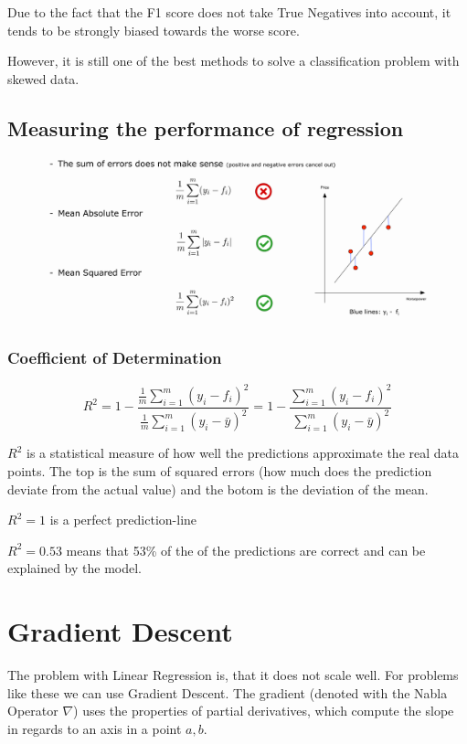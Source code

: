 \documentclass[11pt]{article}
\begin{document}
Due to the fact that the F1 score does not take True Negatives into account, it tends to be strongly biased towards the worse score.

However, it is still one of the best methods to solve a classification problem with skewed data.


\subsection{Measuring the performance of regression}

\begin{figure}[htb]
    \centering
    \includegraphics[keepaspectratio=true, width=\linewidth]{regression_error.png}
    \label{fig:regression_error}
\end{figure}

\subsubsection{Coefficient of Determination} \label{sec:r_squared}

\begin{equation}
    R^2 = 1- \frac{\frac{1}{m} \sum^{m}_{i=1}(y_{i} - f_{i})^2}{\frac{1}{m} \sum^{m}_{i=1}(y_{i} - \bar{y})^2} =1 - \frac{\sum^{m}_{i=1}(y_{i} - f_{i})^2}{\sum^{m}_{i=1}(y_{i} - \bar{y})^2}
\end{equation}

$R^2$ is a statistical measure of how well the predictions approximate the real data points.
The top is the sum of squared errors (how much does the prediction deviate from the actual value) and the botom is the deviation of the mean.

$R^2 = 1$ is a perfect prediction-line

$R^2 = 0.53$ means that 53\% of the of the predictions are correct and can be explained by the model.

\newpage

\section{Gradient Descent}
The problem with Linear Regression is, that it does not scale well. For problems like these we can use Gradient Descent. The gradient (denoted with the Nabla Operator $\nabla$) uses the properties of partial derivatives, which compute the slope in regards to an axis in a point $a,b$.
\end{document}
